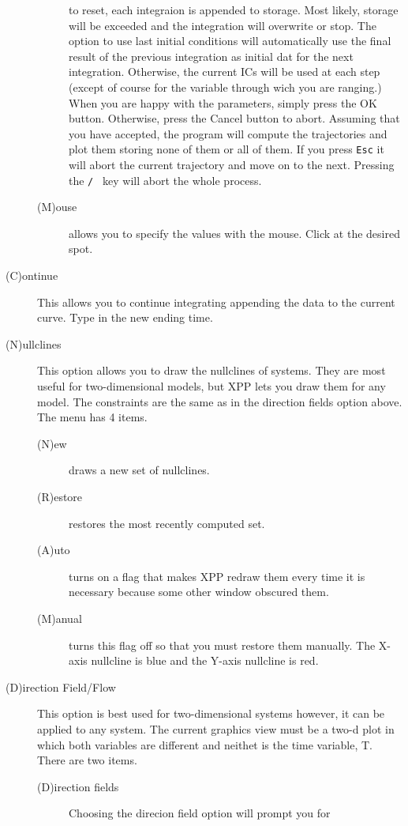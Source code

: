 \begin{description}
\begin{description}
 to reset, each integraion is appended to storage.  Most likely, storage
 will be exceeded and the integration will overwrite or stop. The option 
to use last initial conditions will automatically use the final result of
 the previous integration as initial dat for the next integration.  Otherwise,
 the current ICs will be used at each step (except of course for the  variable
 through wich you are ranging.) When you are happy with the parameters, simply
 press the OK button.  Otherwise, press the Cancel button to abort.  Assuming
 that you have accepted, the program will compute the trajectories and plot 
them storing none of them or all of them.  If you press {\tt Esc} it will abort the 
current trajectory and move on to the next.  Pressing the {\tt / } key will abort
 the whole process. 
\item[(M)ouse]  allows you to specify the values with the mouse.  Click at the
 desired spot.
\end{description}
\item[(C)ontinue]  This allows you to continue integrating appending the data
 to the 
current curve. Type in the new ending time.
\item[(N)ullclines]  This option allows you to draw the nullclines of systems.  
They are most useful for two-dimensional models, but XPP lets you draw them for
 any model.  The constraints are the same as in the direction fields option
 above.  The menu has 4 items.
\begin{description}
\item[(N)ew] draws a new set of nullclines.
\item[(R)estore] restores the most recently computed set.
\item[(A)uto] turns on a flag that makes 
XPP redraw them every time it is necessary because some other window obscured
 them.
\item[(M)anual] turns this flag off so that you must restore them manually.
 The X-axis nullcline is blue and the Y-axis nullcline is red.
\end{description}
\item[(D)irection Field/Flow]
This option is best used for two-dimensional systems however,
 it can be applied to any system.  The current graphics view must be a
 two-d plot in which both variables are different and neithet is the time
 variable, T.  There are two items.
\begin{description}
\item[(D)irection fields] Choosing the direcion field option will prompt you for 

\end{description}
\end{description}
